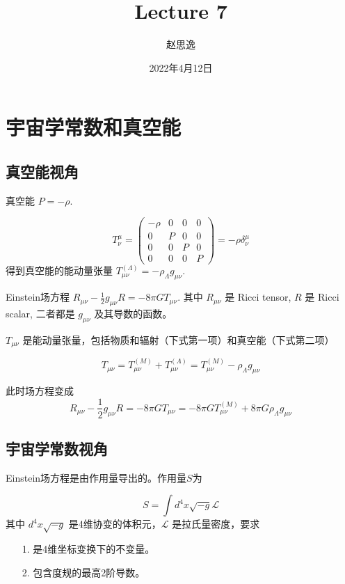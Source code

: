 \documentclass[12pt]{ctexart}
\title{Lecture 7}
\author{赵思逸}
\date{2022年4月12日}
\begin{document}
\maketitle


\section{宇宙学常数和真空能}

\subsection{真空能视角}
真空能 $P=-\rho$.

\begin{equation} 
    T^\mu_{\nu} = \left(\begin{array}{llll}-\rho & 0 & 0 & 0 \\ 0 & P & 0 & 0 \\ 0& 0& P &0 \\ 0 & 0&0&P\end{array}\right) = -\rho \delta^\mu_{\nu}
\end{equation}
得到真空能的能动量张量 $T_{\mu\nu}^{(\Lambda)}=- \rho_\Lambda g_{\mu\nu}$.

Einstein场方程 $R_{\mu\nu} - \frac{1}{2} g_{\mu\nu} R = -8\pi G T_{\mu\nu}$.
其中 $R_{\mu\nu}$ 是 Ricci tensor,  $R$ 是 Ricci scalar, 二者都是  $g_{\mu\nu}$ 及其导数的函数。

$T_{\mu\nu}$ 是能动量张量，包括物质和辐射（下式第一项）和真空能（下式第二项）

\begin{equation}
    T_{\mu\nu} = T_{\mu\nu}^{(M)} + T_{\mu\nu}^{(\Lambda)} = T_{\mu\nu}^{(M)} - \rho_\Lambda g_{\mu\nu}
\end{equation}

此时场方程变成 
\begin{equation} \label{Eeq.vacuum}
    R_{\mu\nu} - \frac{1}{2} g_{\mu\nu} R = -8\pi G T_{\mu\nu} =  -8\pi G T_{\mu\nu}^{(M)} +  8\pi G \rho_\Lambda g_{\mu\nu}
\end{equation}

\subsection{宇宙学常数视角}
Einstein场方程是由作用量导出的。作用量$S$为

\begin{equation}
    S = \int d^4 x \sqrt{-g} \mathcal{L} 
\end{equation}
其中 $d^4 x \sqrt{-g}$ 是4维协变的体积元，$\mathcal{L}$ 是拉氏量密度，要求 
\begin{itemize}
    \item[1.] 是4维坐标变换下的不变量。
    \item[2.] 包含度规的最高2阶导数。
\end{itemize}
\end{document}
